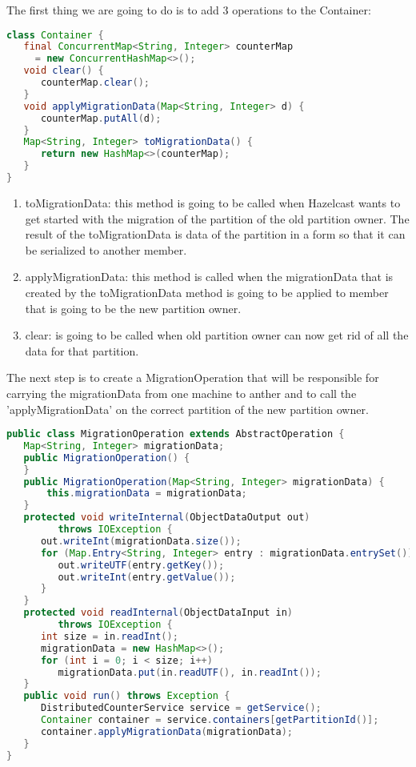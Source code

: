 The first thing we are going to do is to add 3 operations to the Container:
\begin{lstlisting}[language=java]
class Container {
   final ConcurrentMap<String, Integer> counterMap 
     = new ConcurrentHashMap<>();
   void clear() {
      counterMap.clear();
   }
   void applyMigrationData(Map<String, Integer> d) {
      counterMap.putAll(d);
   }
   Map<String, Integer> toMigrationData() {
      return new HashMap<>(counterMap);
   }
}
\end{lstlisting}
\begin{enumerate}
\item toMigrationData: this method is going to be called when Hazelcast wants to get started with the migration of the partition of the old partition owner. The result of the toMigrationData is data of the partition in a form so that it can be serialized to another member.
\item applyMigrationData: this method is called when the migrationData that is created by the toMigrationData method is going to be applied to member that is going to be the new partition owner.
\item clear: is going to be called when old partition owner can now get rid of all the data for that partition. 
\end{enumerate}

The next step is to create a MigrationOperation that will be responsible for carrying the migrationData from one machine to anther and to call the 'applyMigrationData' on the correct partition of the new partition owner.
\begin{lstlisting}[language=java]
public class MigrationOperation extends AbstractOperation {
   Map<String, Integer> migrationData;
   public MigrationOperation() {
   }
   public MigrationOperation(Map<String, Integer> migrationData) {
       this.migrationData = migrationData;
   }
   protected void writeInternal(ObjectDataOutput out) 
         throws IOException {
      out.writeInt(migrationData.size());
      for (Map.Entry<String, Integer> entry : migrationData.entrySet()) {
         out.writeUTF(entry.getKey());
         out.writeInt(entry.getValue());
      }
   }
   protected void readInternal(ObjectDataInput in) 
         throws IOException {
      int size = in.readInt();
      migrationData = new HashMap<>();
      for (int i = 0; i < size; i++)
         migrationData.put(in.readUTF(), in.readInt());
   }
   public void run() throws Exception {
      DistributedCounterService service = getService();
      Container container = service.containers[getPartitionId()];
      container.applyMigrationData(migrationData);
   }
}
\end{lstlisting}

